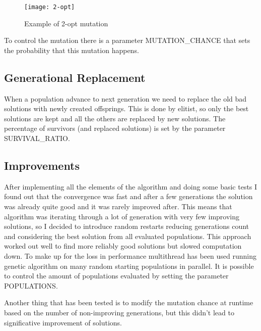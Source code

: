 		\begin{figure}[h]
		\texttt{[image: 2-opt]}
		\centering
		\caption{Example of 2-opt mutation}
		\end{figure}
		
		To control the mutation there is a parameter MUTATION\_CHANCE that sets the probability that this mutation happens.
		
	\subsection{Generational Replacement}
		When a population advance to next generation we need to replace the old bad solutions with newly created offsprings. This is done by elitist, so only the best solutions are kept and all the others are replaced by new solutions. The percentage of survivors (and replaced solutions) is set by the parameter SURVIVAL\_RATIO.
		
	\subsection{Improvements}
		After implementing all the elements of the algorithm and doing some basic tests I found out that the convergence was fast and after a few generations the solution was already quite good and it was rarely improved after. This means that algorithm was iterating through a lot of generation with very few improving solutions, so I decided to introduce random restarts reducing generations count and considering the best solution from all evaluated populations. This approach worked out well to find more reliably good solutions but slowed computation down. To make up for the loss in performance multithread has been used running genetic algorithm on many random starting populations in parallel. It is possible to control the amount of populations evaluated by setting the parameter POPULATIONS.
		
		Another thing that has been tested is to modify the mutation chance at runtime based on the number of non-improving generations, but this didn't lead to significative improvement of solutions.
		
		